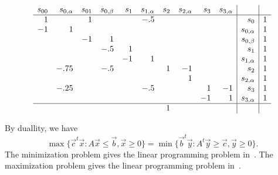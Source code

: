 {\[\begin{array}{rrrrrrrrrr|r|r}
       s_{00} & s_{0,\alpha} & s_{01} & s_{0, \beta} &
       s_1 & s_{1, \alpha} &
       s_2 & s_{2, \alpha} &
       s_3 & s_{3, \alpha} & \\
       \hline
        1 &      &  1 &     &    & -.5 &    &    &    &    & s_0 & 1 \\
       -1 &    1 &    &     &    &     &    &    &    &    & s_{0,\alpha} & 1 \\
          &      & -1 &   1 &    &     &    &    &    &    & s_{0,\beta} & 1 \\
          &      &    & -.5 &  1 &     &    &    &    &    & s_1 & 1 \\
          &      &    &     & -1 &   1 &    &    &    &    & s_{1,\alpha} & 1 \\
          & -.75 &    & -.5 &    &     &  1 & -1 &    &    & s_2 & 1 \\
          &      &    &     &    &     &    &  1 &    &    & s_{2,\alpha} & 1 \\
          & -.25 &    &     &    & -.5 &    &    &  1 & -1 & s_3 & 1 \\
          &      &    &     &    &     &    &    & -1 &  1 & s_{3,\alpha} & 1 \\
       \hline
          &      &    &     &    &     &  1 &    &    &    &
          \end{array}
\]

By duallity, we have
\begin{equation*}
  \max \{ \vec{c}^t \vec{x} : A \vec{x} \leq \vec{b}, \vec{x} \geq 0 \}
  =
  \min \{ \vec{b}^t \vec{y} : A^t \vec{y} \geq \vec{c}, \vec{y} \geq 0 \}.
\end{equation*}
The minimization problem gives the linear programming problem
in~\cite{CY:98:MDPRE}. The maximization problem gives the linear
programming problem in~\cite{EKVY:07:MMCMDP}.
}

